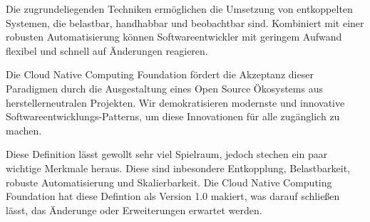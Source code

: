 Die zugrundeliegenden Techniken ermöglichen die Umsetzung von entkoppelten Systemen, die belastbar, handhabbar und beobachtbar sind. Kombiniert mit einer robusten Automatisierung können Softwareentwickler mit geringem Aufwand flexibel und schnell auf Änderungen reagieren.

Die Cloud Native Computing Foundation fördert die Akzeptanz dieser Paradigmen durch die Ausgestaltung eines Open Source Ökosystems aus herstellerneutralen Projekten. Wir demokratisieren modernste und innovative Softwareentwicklungs-Patterns, um diese Innovationen für alle zugänglich zu machen.

Diese Definition lässt gewollt sehr viel Spielraum, jedoch stechen ein paar wichtige Merkmale heraus. Diese sind inbesondere Entkopplung, Belastbarkeit, robuste Automatisierung und Skalierbarkeit. Die Cloud Native Computing Foundation hat diese Defintion als Version 1.0 makiert, was darauf schließen lässt, das Änderunge oder Erweiterungen erwartet werden.

